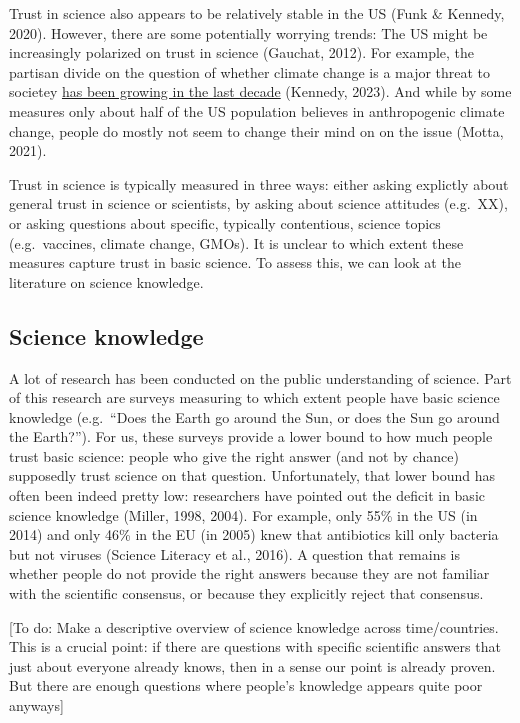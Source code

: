 \documentclass[
  doc,floatsintext]{apa6}
\begin{document}
Trust in science also appears to be relatively stable in the US (Funk \& Kennedy, 2020). However, there are some potentially worrying trends: The US might be increasingly polarized on trust in science (Gauchat, 2012). For example, the partisan divide on the question of whether climate change is a major threat to societey \href{https://www.pewresearch.org/short-reads/2023/08/09/what-the-data-says-about-americans-views-of-climate-change/}{has been growing in the last decade} (Kennedy, 2023). And while by some measures only about half of the US population believes in anthropogenic climate change, people do mostly not seem to change their mind on on the issue (Motta, 2021).

Trust in science is typically measured in three ways: either asking explictly about general trust in science or scientists, by asking about science attitudes (e.g.~XX), or asking questions about specific, typically contentious, science topics (e.g.~vaccines, climate change, GMOs). It is unclear to which extent these measures capture trust in basic science. To assess this, we can look at the literature on science knowledge.

\subsection{Science knowledge}\label{science-knowledge}

A lot of research has been conducted on the public understanding of science. Part of this research are surveys measuring to which extent people have basic science knowledge (e.g.~``Does the Earth go around the Sun, or does the Sun go around the Earth?''). For us, these surveys provide a lower bound to how much people trust basic science: people who give the right answer (and not by chance) supposedly trust science on that question. Unfortunately, that lower bound has often been indeed pretty low: researchers have pointed out the deficit in basic science knowledge (Miller, 1998, 2004). For example, only 55\% in the US (in 2014) and only 46\% in the EU (in 2005) knew that antibiotics kill only bacteria but not viruses (Science Literacy et al., 2016). A question that remains is whether people do not provide the right answers because they are not familiar with the scientific consensus, or because they explicitly reject that consensus.

{[}To do: Make a descriptive overview of science knowledge across time/countries. This is a crucial point: if there are questions with specific scientific answers that just about everyone already knows, then in a sense our point is already proven. But there are enough questions where people's knowledge appears quite poor anyways{]}
\end{document}
